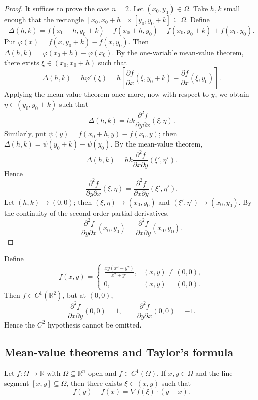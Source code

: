 \begin{proof}
It suffices to prove the case $n = 2$. Let $(x_0, y_0) \in \Omega$. Take $h, k$ small enough that the rectangle $[x_0, x_0 + h] \times [y_0, y_0 + k] \subseteq \Omega$. Define
\[
\Delta(h, k) = f(x_0 + h, y_0 + k) - f(x_0 + h, y_0) - f(x_0, y_0 + k) + f(x_0, y_0).
\]
Put $\varphi(x) = f(x, y_0 + k) - f(x, y_0)$. Then $\Delta(h, k) = \varphi(x_0 + h) - \varphi(x_0)$. By the one-variable mean-value theorem, there exists $\xi \in (x_0, x_0 + h)$ such that
\[
\Delta(h, k) = h \varphi'(\xi) = h \left[ \frac{\partial f}{\partial x}(\xi, y_0 + k) - \frac{\partial f}{\partial x}(\xi, y_0) \right].
\]
Applying the mean-value theorem once more, now with respect to $y$, we obtain $\eta \in (y_0, y_0 + k)$ such that
\[
\Delta(h, k) = hk \frac{\partial^2 f}{\partial y \partial x}(\xi, \eta).
\]
Similarly, put $\psi(y) = f(x_0 + h, y) - f(x_0, y)$; then $\Delta(h, k) = \psi(y_0 + k) - \psi(y_0)$. By the mean-value theorem,
\[
\Delta(h, k) = hk \frac{\partial^2 f}{\partial x \partial y}(\xi', \eta').
\]
Hence
\[
\frac{\partial^2 f}{\partial y \partial x}(\xi, \eta) = \frac{\partial^2 f}{\partial x \partial y}(\xi', \eta').
\]
Let $(h, k) \to (0, 0)$; then $(\xi, \eta) \to (x_0, y_0)$ and $(\xi', \eta') \to (x_0, y_0)$. By the continuity of the second-order partial derivatives,
\[
\frac{\partial^2 f}{\partial y \partial x}(x_0, y_0) = \frac{\partial^2 f}{\partial x \partial y}(x_0, y_0).
\]
\end{proof}

\begin{example}\label{ex:clairaut_failure_ra}
Define
\[
f(x, y) = \begin{cases} \frac{xy(x^2 - y^2)}{x^2 + y^2}, & (x, y) \neq (0, 0), \\ 0, & (x, y) = (0, 0). \end{cases}
\]
Then $f \in C^1(\mathbb{R}^2)$, but at $(0, 0)$,
\[
\frac{\partial^2 f}{\partial x \partial y}(0, 0) = 1, \qquad \frac{\partial^2 f}{\partial y \partial x}(0, 0) = -1.
\]
Hence the $C^2$ hypothesis cannot be omitted.
\end{example}

\subsection{Mean-value theorems and Taylor's formula}

\begin{theorem}\label{thm:multivariable_mean_value}
Let $f: \Omega \to \mathbb{R}$ with $\Omega \subseteq \mathbb{R}^n$ open and $f \in C^1(\Omega)$. If $x, y \in \Omega$ and the line segment $[x, y] \subseteq \Omega$, then there exists $\xi \in (x, y)$ such that
\[
f(y) - f(x) = \nabla f(\xi) \cdot (y - x).
\]
\end{theorem}

